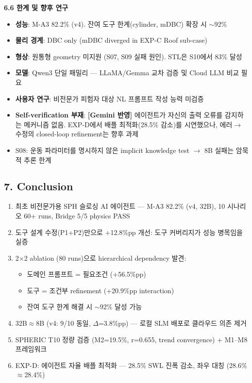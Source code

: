 \documentclass[11pt,a4paper]{article}
\begin{document}
\textbf{6.6 한계 및 향후 연구}
\begin{itemize}[nosep,leftmargin=1.5em]
\item \textbf{성능}: M-A3 82.2\% (v4). 잔여 도구 한계(cylinder, mDBC) 확장 시 $\sim$92\%
\item \textbf{물리 경계}: DBC only (mDBC diverged in EXP-C Roof sub-case)
\item \textbf{형상}: 원통형 geometry 미지원 (S07, S09 실패 원인). STL은 S10에서 83\% 달성
\item \textbf{모델}: Qwen3 단일 패밀리 --- LLaMA/Gemma 교차 검증 및 Cloud LLM 비교 필요
\item \textbf{사용자 연구}: 비전문가 피험자 대상 NL 프롬프트 작성 능력 미검증
\item \textbf{Self-verification 부재}: {\color{red}\textbf{[Gemini 반영]}} 에이전트가 자신의 출력 오류를 감지하는 메커니즘 없음. EXP-D에서 배플 최적화(28.5\% 감소)를 시연했으나, 에러$\rightarrow$수정의 closed-loop refinement는 향후 과제
\item S08: 운동 파라미터를 명시하지 않은 implicit knowledge test $\rightarrow$ 8B 실패는 암묵적 추론 한계
\end{itemize}

\subsection{7. Conclusion}
\begin{enumerate}[nosep,leftmargin=1.5em]
\item 최초 비전문가용 SPH 슬로싱 AI 에이전트 --- M-A3 82.2\% (v4, 32B), 10 시나리오 60+ runs, Bridge 5/5 physics PASS
\item 도구 설계 수정(P1+P2)만으로 +12.8\%pp 개선: 도구 커버리지가 성능 병목임을 실증
\item 2$\times$2 ablation (80 runs)으로 hierarchical dependency 발견:
  \begin{itemize}[nosep,leftmargin=1em]
  \item 도메인 프롬프트 = 필요조건 (+56.5\%pp)
  \item 도구 = 조건부 refinement (+20.9\%pp interaction)
  \item 잔여 도구 한계 해결 시 $\sim$92\% 달성 가능
  \end{itemize}
\item 32B$\approx$8B (v4: 9/10 동일, $\Delta$=3.8\%pp) --- 로컬 SLM 배포로 클라우드 의존 제거
\item SPHERIC T10 정량 검증 (M2=19.5\%, r=0.655, trend convergence) + M1--M8 프레임워크
\item EXP-D: 에이전트 자율 배플 최적화 --- 28.5\% SWL 진폭 감소, 좌우 대칭 (28.6\%$\approx$28.4\%)
\end{enumerate}
\end{document}
